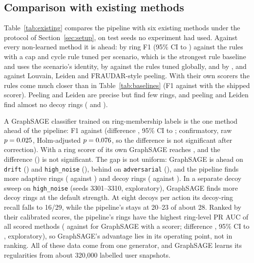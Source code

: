 \subsection{Comparison with existing methods}
\label{sec:existing}

Table~\ref{tab:existing} compares the pipeline with six existing methods under
the protocol of Section~\ref{sec:setup}, on test seeds no experiment had used.
Against every non-learned method it is ahead: by \RfExrulesperscenarioDA{} ring
F1 (95\% CI \RfExrulesperscenarioLo{} to \RfExrulesperscenarioHi{}) against the
rules with a cap and cycle rule tuned per scenario, which is the strongest rule
baseline and uses the scenario's identity, by \RfExrulesDA{} against the rules
tuned globally, and by \RfExlouvainDA{}, \RfExleidenDA{} and \RfExpeelingDA{}
against Louvain, Leiden and FRAUDAR-style peeling. With their own scorers the
rules come much closer than in Table~\ref{tab:baselines} (F1 \RfExrulesF{}
against \ECapTenSF{} with the shipped scorer). Peeling and Leiden are precise
but find few rings, and peeling and Leiden find almost no decoy rings
(\RfExpeelingDecoy{} and \RfExleidenDecoy{}).

A GraphSAGE classifier trained on ring-membership labels is the one method
ahead of the pipeline: F1 \RfExgnnunscoredF{} against \RfExproposedF{}
(difference \RfExgnnunscoredD{}, 95\% CI \RfExgnnunscoredLo{} to
\RfExgnnunscoredHi{}; confirmatory, raw $p=0.025$, Holm-adjusted
$p=0.076$, so the difference is not significant after correction). With a ring scorer of its own GraphSAGE
reaches \RfExgnnF{}, and the difference (\RfExgnnD{}) is not significant. The
gap is not uniform: GraphSAGE is ahead on \texttt{drift} (\RfExgnnunscoredDrift{})
and \texttt{high\_noise} (\RfExgnnunscoredNoise{}), behind on
\texttt{adversarial} (\RfExgnnunscoredAdv{}), and the pipeline finds more
adaptive rings (\RfExproposedAdapt{} against \RfExgnnunscoredAdapt{}) and decoy
rings (\RfExproposedDecoy{} against \RfExgnnunscoredDecoy{}). In a separate decoy
sweep on \texttt{high\_noise} (seeds 3301--3310, exploratory), GraphSAGE finds
more decoy rings at the default strength. At eight decoys per action its
decoy-ring recall falls to 16/29, while the pipeline's stays at 20--23 of about 28. Ranked by their
calibrated scores, the pipeline's rings have the highest ring-level PR AUC of
all scored methods (\RfExproposedPR{} against \RfExgnnPR{} for GraphSAGE with a
scorer; difference \RtPrD{}, 95\% CI \RtPrLo{} to \RtPrHi{}, exploratory), so
GraphSAGE's advantage lies in its operating point, not in ranking.
All of these data come from one generator, and GraphSAGE learns its regularities
from about 320{,}000 labelled user snapshots.

